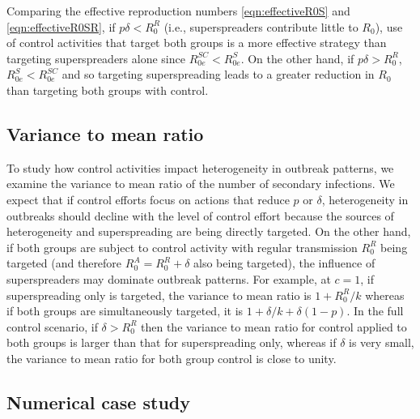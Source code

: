 \documentclass{imammb}
\numberwithin{equation}{section}
\begin{document}
Comparing the effective reproduction numbers \eqref{eqn:effectiveR0S} and \eqref{eqn:effectiveR0SR}, if $p \delta < R_0^R$ (i.e., superspreaders contribute little to $R_0$), use of control activities that target both groups is a more effective strategy than targeting superspreaders alone since $R_{0e}^{SC} < R_{0e}^{S}$.   On the other hand, if $p\delta > R_0^R$, $R_{0e}^{S} < R_{0e}^{SC}$ and so targeting superspreading leads to a greater reduction in $R_0$ than targeting both groups with control. 

\subsection{Variance to mean ratio}

To study how control activities impact heterogeneity in outbreak patterns, we examine the variance to mean ratio of the number of secondary infections. We expect that if control efforts focus on actions that reduce $p$ or $\delta$, heterogeneity in outbreaks should decline with the level of control effort because the sources of heterogeneity and superspreading are being directly targeted. On the other hand, if both groups are subject to control activity with regular transmission $R_0^R$ being targeted (and therefore $R_0^A=R_0^R + \delta$ also being targeted), the influence of superspreaders may dominate outbreak patterns. For example, at $c=1$, if superspreading only is targeted, the variance to mean ratio is $1+R_0^R/k$ whereas if both groups are simultaneously targeted, it is $1+\delta/k + \delta(1-p)$. In the full control scenario, if $\delta > R_0^R$ then the variance to mean ratio for control applied to both groups is larger than that for superspreading only, whereas if $\delta$ is very small, the variance to mean ratio for both group control is close to unity. 

\subsection{Numerical case study}
\end{document}
